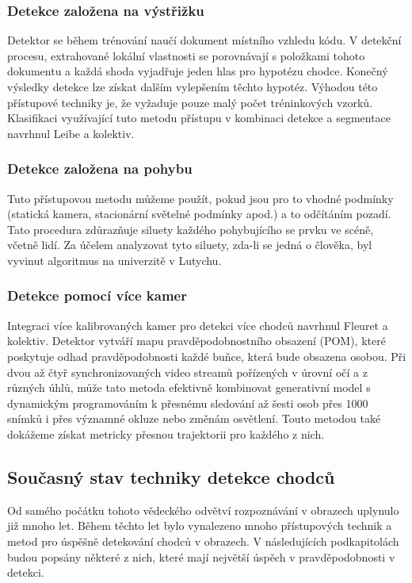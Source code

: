 \subsubsection{Detekce založena na výstřižku}

Detektor se během trénování naučí dokument místního vzhledu kódu. V detekční procesu, extrahované lokální vlastnosti se porovnávají s položkami tohoto dokumentu a každá shoda vyjadřuje jeden hlas pro hypotézu chodce. Konečný výsledky detekce lze získat dalším vylepšením těchto hypotéz. Výhodou této přístupové techniky je, že vyžaduje pouze malý počet tréninkových vzorků. Klasifikaci využívající tuto metodu přístupu v kombinaci detekce a segmentace navrhnul Leibe a kolektiv\cite{leibe}.

\subsubsection{Detekce založena na pohybu}

Tuto přístupovou metodu můžeme použít, pokud jsou pro to vhodné podmínky (statická kamera, stacionární světelné podmínky apod.) a to odčítáním pozadí.  Tato procedura zdůrazňuje siluety každého pohybujícího se prvku ve scéně, včetně lidí. Za účelem analyzovat tyto siluety, zda-li se jedná o člověka, byl vyvinut algoritmus na univerzitě v Lutychu\cite{motionAlg1}\cite{motionAlg2}.

\subsubsection{Detekce pomocí více kamer}

Integraci více kalibrovaných kamer pro detekci více chodců navrhnul Fleuret a kolektiv\cite{multiCameras}. Detektor vytváří mapu pravděpodobnostního obsazení (POM), které poskytuje odhad pravděpodobnosti každé buňce, která bude obsazena osobou. Při dvou až čtyř synchronizovaných video streamů pořízených v úrovní očí a z různých úhlů, může tato metoda efektivně kombinovat generativní model s dynamickým programováním k přesnému sledování až šesti osob přes 1000 snímků i přes významné okluze nebo změnám osvětlení. Touto metodou také dokážeme získat metricky přesnou trajektorii pro každého z nich.

\subsection{Současný stav techniky detekce chodců}
Od samého počátku tohoto vědeckého odvětví rozpoznávání v obrazech uplynulo již mnoho let. Během těchto let bylo vynalezeno mnoho přístupových technik a metod pro úspěšně detekování chodců v obrazech. V následujících podkapitolách budou popsány některé z nich, které mají největší úspěch v pravděpodobnosti v detekci.

